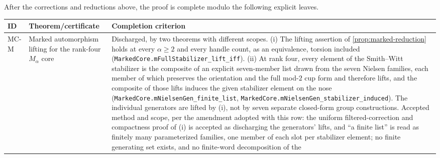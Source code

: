\documentclass[11pt,reqno]{amsart}
\theoremstyle{remark}
\numberwithin{equation}{section}
\begin{document}
After the corrections and reductions above, the proof is complete modulo
the following explicit leaves.

\begin{longtable}{>{\raggedright\arraybackslash}p{}
                  >{\raggedright\arraybackslash}p{}
                  >{\raggedright\arraybackslash}p{}}
\toprule
ID & Theorem/certificate & Completion criterion\\
\midrule
\endhead
MC-M & Marked automorphism lifting for the rank-four \(M_\alpha\) core &
Discharged, by two theorems with different scopes.  (i) The lifting assertion
of \cref{prop:marked-reduction} holds at every \(\alpha\ge2\) and every handle
count, as an equivalence, torsion included
(\texttt{MarkedCore.\allowbreak mFullStabilizer\_lift\_iff}).  (ii) At rank four, every
element of the Smith--Witt stabilizer is the composite of an explicit
seven-member list drawn from the seven Nielsen families, each member of which
preserves the orientation and the full mod-\(2\) cup form and therefore lifts,
and the composite of those lifts induces the given stabilizer element on the
nose (\texttt{MarkedCore.\allowbreak mNielsenGen\_finite\_list},
\texttt{MarkedCore.\allowbreak mNielsenGen\_stabilizer\_induced}).  The individual
generators are lifted by (i), not by seven separate closed-form group
constructions.  Accepted method and scope, per the amendment adopted with this
row: the uniform filtered-correction and compactness proof of (i) is accepted
as discharging the generators' lifts, and ``a finite list'' is read as finitely
many parameterized families, one member of each slot per stabilizer element;
no finite generating set exists, and no finite-word decomposition of the

\end{longtable}
\end{document}
